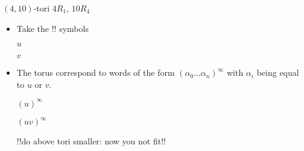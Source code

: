 \documentclass[%
pdf,
colorBG,
slideColor,
]{prosper}
\begin{document}
\begin{slide}{$(4,10)$-tori $4R_1$, $10R_4$}
\begin{itemize}
\item Take the 
!!%
symbols
\begin{center}
\begin{minipage}{5.3cm}
\centering
{}\par
$u$
\end{minipage}
\begin{minipage}{5.3cm}
\centering
{}\par
$v$
\end{minipage}
\end{center}
\item The torus correspond to words of the form $(\alpha_0\dots\alpha_n)^{\infty}$ with $\alpha_i$ being equal to $u$ or $v$.
\begin{center}
\begin{minipage}{5.2cm}
\centering
{}\par
$(u)^{\infty}$
\end{minipage}
\begin{minipage}{5.2cm}
\centering
{}\par
$(uv)^{\infty}$
\end{minipage}
!!do above tori smaller: now you not fit!!
\end{center}

\end{itemize}
\end{slide}
\end{document}
